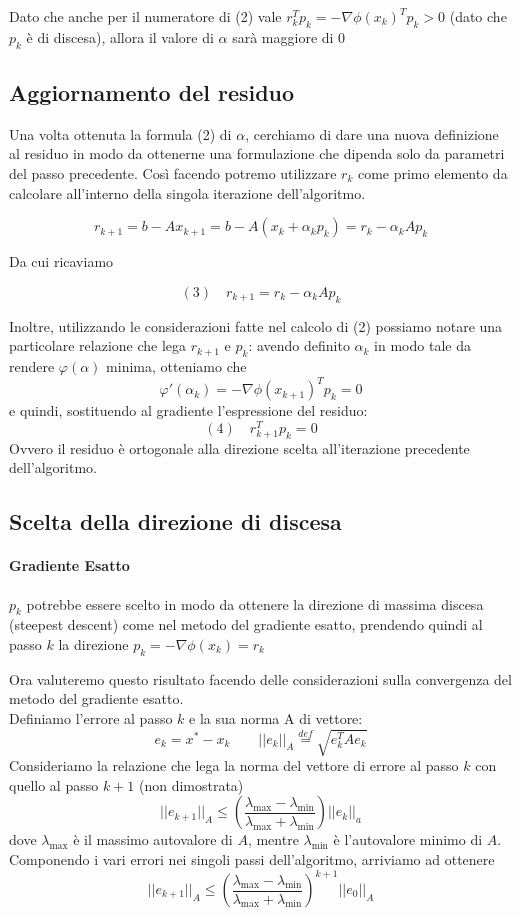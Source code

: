 Dato che anche per il numeratore di (2) vale $ r_{k}^{T} p_{k} =
-\nabla \phi(x_{k})^{T} p_{k} > 0 $ (dato che $p_{k}$ \`e di discesa),
allora il valore di $\alpha$ sarà maggiore di 0

\subsection{Aggiornamento del residuo}

Una volta ottenuta la formula (2) di $\alpha$, cerchiamo di dare una
nuova definizione al residuo in modo da ottenerne una formulazione che
dipenda solo da parametri del passo precedente. Così facendo potremo
utilizzare $r_{k}$ come primo elemento da calcolare all'interno della
singola iterazione dell'algoritmo.

$$ r_{k+1} = b-A x_{k+1} = b-A(x_{k} + \alpha_{k} p_{k}) = r_{k}  - \alpha_{k} A p_{k}$$

Da cui ricaviamo

$$ (3) \quad r_{k+1} = r_{k} - \alpha_{k} A p_{k}$$

Inoltre, utilizzando le considerazioni fatte nel calcolo di (2)
possiamo notare una particolare relazione che lega $r_{k+1}$ e
$p_{k}$: avendo definito $\alpha_{k}$ in modo tale da rendere
$\varphi(\alpha)$ minima, otteniamo che
$$  \varphi'(\alpha_{k}) = -\nabla \phi(x_{k+1})^{T} p_{k} = 0$$
e quindi, sostituendo al gradiente l'espressione del residuo:
$$(4) \quad r_{k+1}^{T} p_{k} = 0$$
Ovvero il residuo \`e ortogonale alla direzione scelta all'iterazione
precedente dell'algoritmo.

\subsection{Scelta della direzione di discesa}
\paragraph{Gradiente Esatto}
$p_{k}$ potrebbe essere
scelto in modo da ottenere la direzione di massima discesa (steepest
descent) come nel metodo del gradiente esatto, prendendo quindi al
passo $k$ la direzione $p_{k} = - \nabla \phi(x_{k}) = r_{k}$

Ora valuteremo questo risultato facendo delle considerazioni sulla
convergenza del metodo del gradiente esatto.  \\ 
Definiamo l'errore al passo $k$ e la sua norma A di vettore:
$$ e_{k} = x^{*} - x_{k} \qquad ||e_{k} ||_{A} \stackrel{def}{=} \sqrt{e_{k}^{T} A e_{k}}$$
Consideriamo la relazione che lega la norma del vettore di errore al
passo $k$ con quello al passo $k+1$ (non dimostrata)
$$ || e_{k+1} ||_{A} \leq 
\left( \frac{\lambda_{\max} - \lambda_{\min}}{\lambda_{\max}+
\lambda_{\min}}\right) ||{e_{k}}||_{a}$$ dove $\lambda_{\max}$ \`e il
massimo autovalore di $A$, mentre $\lambda_{\min}$ \`e l'autovalore
minimo di $A$.  Componendo i vari errori nei singoli passi
dell'algoritmo, arriviamo ad ottenere
$$ || e_{k+1} ||_{A} \leq 
\left( \frac{\lambda_{\max} - \lambda_{\min}}{\lambda_{\max}+
\lambda_{\min}}\right)^{k+1} ||{e_{0}}||_{A}$$

